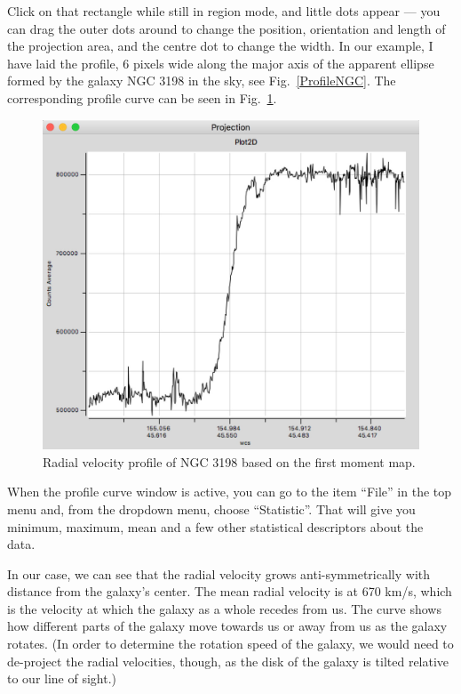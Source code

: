 \documentclass[twocolumn,apj]{openjournal}
\begin{document}
Click on that rectangle while still in region mode, and little dots appear --- you can drag the outer dots around to change the position, orientation and length of the projection area, and the centre dot to change the width. In our example, I have laid the profile, 6 pixels wide along the major axis of the apparent ellipse formed by the galaxy NGC 3198 in the sky, see Fig.~\ref{ProfileNGC}. The corresponding profile curve can be seen in Fig.~\ref{ProfileNGCCurve}. 
\begin{figure}[htbp]
\begin{center}
\includegraphics[width=\linewidth]{ngc-profile-curve.jpg}
\caption{Radial velocity profile of NGC 3198 based on the first moment map.}
\label{ProfileNGCCurve}
\end{center}
\end{figure}

When the profile curve window is active, you can go to the item ``File'' in the top menu and, from the dropdown menu, choose ``Statistic''. That will give you minimum, maximum, mean and a few other statistical descriptors about the data. 

In our case, we can see that the radial velocity grows anti-symmetrically with distance from the galaxy's center. The mean radial velocity is at 670 km/s, which is the velocity at which the galaxy as a whole recedes from us. The curve shows how different parts of the galaxy move towards us or away from us as the galaxy rotates. (In order to determine the rotation speed of the galaxy, we would need to de-project the radial velocities, though, as the disk of the galaxy is tilted relative to our line of sight.) 
\end{document}
